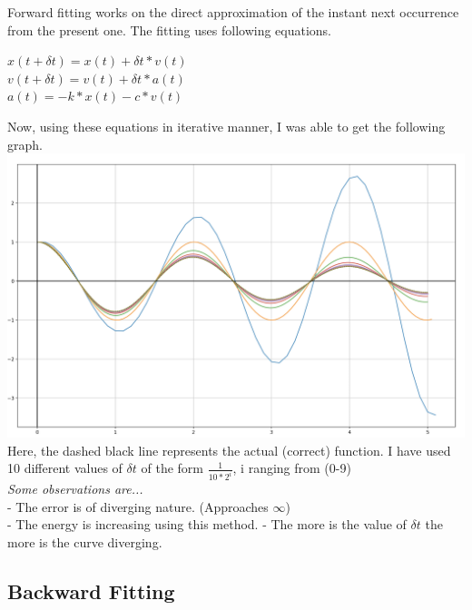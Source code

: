 \documentclass{article}
\begin{document}
        Forward fitting works on the direct approximation of the instant next occurrence from the present one. The fitting uses following equations.
                \begin{center}
                \(x(t+\delta t) = x(t) + \delta t*v(t)\) \\
                \(v(t+\delta t) = v(t) + \delta t*a(t)\) \\
                \(a(t) = - k*x(t) - c*v(t)\) \\
                \end{center}
        Now, using these equations in iterative manner, I was able to get the following graph. \\
        \includegraphics[scale=.25]{../Forward.png} \\
        Here, the dashed black line represents the actual (correct) function. I have used 10 different values of \(\delta t\) of the form \(\frac{1}{10 * 2^i}\), i ranging from (0-9) \\[20pt]
        \textit{Some observations are...} \\
             - The error is of diverging nature. (Approaches \(\infty\)) \\
             - The energy is increasing using this method.
             - The more is the value of \(\delta t\) the more is the curve diverging.
    
        \pagebreak
        \subsection*{Backward Fitting}
    
\end{document}
